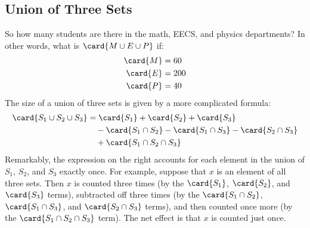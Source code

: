 \iffalse
$S_1$ into the elements prove equation~\eqref{IE2} rigorously by applying
the Sum Rule to some disjoint subsets of $S_1 \union S_2$.  As a first
step, we observe that given any two sets, $S,T$, we can decompose $S$ into
the disjoint sets consisting of those elements in $S$ but not $T$, and
those elements in $S$ and also in $T$.  That is, $S$ is the union of the
disjoint sets $S-T$ and $S \intersect T$.  So by the Sum Rule we have
\begin{align}
\card{S} & = \card{S-T} + \card{S \intersect T}, & \text{and so}\notag\\
\card{S-T} & = \card{S} - \card{S \intersect T}.\label{s-t}
\end{align}
Now we decompose $S_1 \union S_2$ into three disjoint sets:
\begin{equation}\label{sin3}
S_1 \cup S_2
     = (S_1 - S_2) \cup (S_2 - S_1) \cup (S_1 \cap S_2).
\end{equation}
Now we have
\begin{align*}
\card{S_1 \cup S_2}
    & = \card{(S_1 - S_2) \cup (S_2 - S_1) \cup (S_1 \cap S_2)}
        && \text{(by~\eqref{sin3})} \\
    & = \card{S_1 - S_2} + \card{S_2 - S_1} + \card{S_1 \cap S_2}
        && \text{(Sum Rule)} \\
    & = (\card{S_1} - \card{S_1 \cap S_2})
      + (\card{S_2} - \card{S_1 \cap S_2})
      + \card{S_1 \cap S_2}
        && \text{(by~\eqref{s-t})} \\
    & = \card{S_1} + \card{S_2} - \card{S_1 \cap S_2}
        && \text{(algebra)}
\end{align*}
\fi


\subsection{Union of Three Sets}

So how many students are there in the math, EECS, and physics
departments?  In other words, what is $\card{M \cup E \cup P}$ if:
%
\begin{align*}
\card{M} & = 60 \\
\card{E} & = 200 \\
\card{P} & = 40
\end{align*}
%
The size of a union of three sets is given by a more complicated
 formula:
%
\begin{align*}
\card{S_1 \cup S_2 \cup S_3} & = \card{S_1} + \card{S_2} + \card{S_3} \\
  & \quad - \card{S_1 \cap S_2} - \card{S_1 \cap S_3} - \card{S_2 \cap S_3} \\
  & \quad + \card{S_1 \cap S_2 \cap S_3}
\end{align*}
%
Remarkably, the expression on the right accounts for each element in the
union of $S_1$, $S_2$, and $S_3$ exactly once.  For example, suppose that
$x$ is an element of all three sets.  Then $x$ is counted three times (by
the $\card{S_1}$, $\card{S_2}$, and $\card{S_3}$ terms), subtracted off
three times (by the $\card{S_1 \cap S_2}$, $\card{S_1 \cap S_3}$, and
$\card{S_2 \cap S_3}$ terms), and then counted once more (by the
$\card{S_1 \cap S_2 \cap S_3}$ term).  The net effect is that $x$ is
counted just once.

